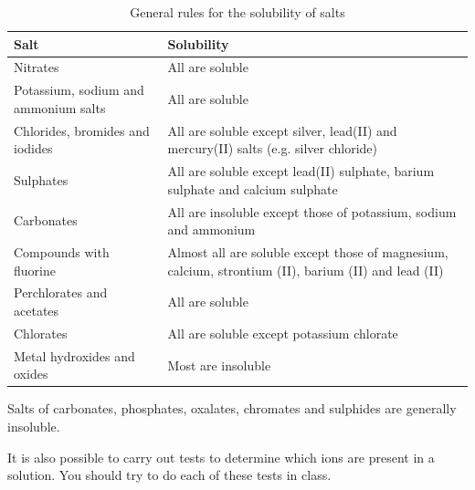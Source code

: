           \begin{table}[H]
        \begin{center}
      \label{m38719*uid69}
    \noindent
      \begin{tabular}{|l|l|}\hline
                \textbf{Salt}
               &
                \textbf{Solubility} \\ \hline
        Nitrates &
        All are soluble \\ \hline
        Potassium, sodium and ammonium salts &
        All are soluble \\ \hline
        Chlorides, bromides and iodides &
        All are soluble except silver, lead(II) and mercury(II) salts (e.g. silver chloride) \\ \hline
        Sulphates &
        All are soluble except lead(II) sulphate, barium sulphate and calcium sulphate \\ \hline
        Carbonates &
        All are insoluble except those of potassium, sodium and ammonium \\ \hline
        Compounds with fluorine &
        Almost all are soluble except those of magnesium, calcium, strontium (II), barium (II) and lead (II) \\ \hline
        Perchlorates and acetates &
        All are soluble \\ \hline
        Chlorates &
        All are soluble except potassium chlorate \\ \hline
        Metal hydroxides and oxides &
        Most are insoluble \\ \hline
    \end{tabular}
      \end{center}
    \caption{General rules for the solubility of salts}
\end{table}
    \par
  \label{m38719*eip-870}Salts of carbonates, phosphates, oxalates, chromates and sulphides are generally insoluble.\par 
      \label{m38719*id341125}It is also possible to carry out tests to determine which ions are present in a solution. You should try to do each of these tests in class.\par 
      \label{m38719*eip-795}
	\par
      \label{m38719*uid70}
